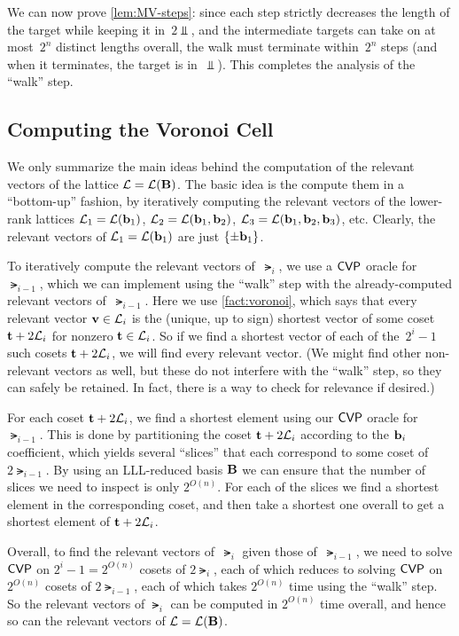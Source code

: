 \documentclass[11pt]{article}
\begin{document}
We can now prove \cref{lem:MV-steps}: since each step strictly decreases the length of the target while keeping it in~$2\Vbar$, and the intermediate targets can take on at most~$2^{n}$ distinct lengths overall, the walk must terminate within~$2^{n}$ steps (and when it terminates, the target is in~$\Vbar$).
This completes the analysis of the ``walk'' step.

\subsection{Computing the Voronoi Cell}%
\label{sec:comp-voron-cell}

We only summarize the main ideas behind the computation of the relevant vectors of the lattice $\mathcal{L}=\mathcal{L}(\mathbf{B})$.
The basic idea is the compute them in a ``bottom-up'' fashion, by iteratively computing the relevant vectors of the lower-rank lattices $\mathcal{L}_{1} = \mathcal{L}(\mathbf{b}_{1})$, $\mathcal{L}_{2} = \mathcal{L}(\mathbf{b}_{1}, \mathbf{b}_{2})$, $\mathcal{L}_{3}=\mathcal{L}(\mathbf{b}_{1}, \mathbf{b}_{2}, \mathbf{b}_{3})$, etc. Clearly, the relevant vectors of $\mathcal{L}_{1} = \mathcal{L}(\mathbf{b}_{1})$ are just $\{\pm \mathbf{b}_{1}\}$.

To iteratively compute the relevant vectors of~$\lat_{i}$, we use a $\mathsf{CVP}$ oracle for~$\lat_{i-1}$, which we can implement using the ``walk'' step with the already-computed relevant vectors of~$\lat_{i-1}$.
Here we use \cref{fact:voronoi}, which says that every relevant vector $\mathbf{v} \in \mathcal{L}_{i}$ is the (unique, up to sign) shortest vector of some coset $\mathbf{t} + 2\mathcal{L}_{i}$ for nonzero $\mathbf{t} \in \mathcal{L}_{i}$.
So if we find a shortest vector of each of the~$2^{i}-1$ such cosets $\mathbf{t} + 2\mathcal{L}_{i}$, we will find every relevant vector.
(We might find other non-relevant vectors as well, but these do not interfere with the ``walk'' step, so they can safely be retained.
In fact, there is a way to check for relevance if desired.)

For each coset $\mathbf{t} + 2\mathcal{L}_{i}$, we find a shortest element using our $\mathsf{CVP}$ oracle for~$\lat_{i-1}$.
This is done by partitioning the coset $\mathbf{t} + 2\mathcal{L}_{i}$ according to the $\mathbf{b}_{i}$ coefficient, which yields several ``slices'' that each correspond to some coset of $2\lat_{i-1}$.
By using an LLL-reduced basis $\mathbf{B}$ we can ensure that the number of slices we need to inspect is only $2^{O(n)}$.
For each of the slices we find a shortest element in the corresponding coset, and then take a shortest one overall to get a shortest element of $\mathbf{t} + 2\mathcal{L}_{i}$.

Overall, to find the relevant vectors of~$\lat_{i}$ given those of~$\lat_{i-1}$, we need to solve $\mathsf{CVP}$ on $2^{i} - 1 = 2^{O(n)}$ cosets of $2\lat_{i}$, each of which reduces to solving $\mathsf{CVP}$ on $2^{O(n)}$ cosets of $2\lat_{i-1}$, each of which takes $2^{O(n)}$ time using the ``walk'' step.
So the relevant vectors of $\lat_{i}$ can be computed in $2^{O(n)}$ time overall, and hence so can the relevant vectors of $\mathcal{L} = \mathcal{L}(\mathbf{B})$.



\end{document}

